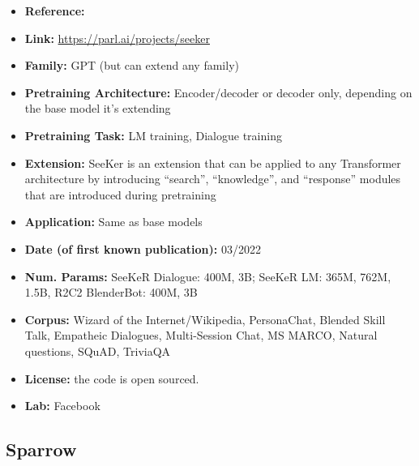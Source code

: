 \documentclass{article}
\begin{document}
            \begin{itemize}
                \item \textbf{Reference:} 
                \item \textbf{Link:} \url{https://parl.ai/projects/seeker}
                \item \textbf{Family:} GPT (but can extend any family) 
                \item \textbf{Pretraining Architecture:} Encoder/decoder or decoder only, depending on the base model it’s extending
                \item \textbf{Pretraining Task:} LM training, Dialogue training
                \item \textbf{Extension:} SeeKer is an extension that can be applied to any Transformer architecture by introducing “search”, “knowledge”, and “response” modules that are introduced during pretraining  
                \item \textbf{Application:} Same as base models
                \item \textbf{Date (of first known publication):} 03/2022
                \item \textbf{Num. Params:} SeeKeR Dialogue: 400M, 3B; SeeKeR LM: 365M, 762M, 1.5B, R2C2 BlenderBot: 400M, 3B
                \item \textbf{Corpus:} Wizard of the Internet/Wikipedia, PersonaChat, Blended Skill Talk, Empatheic Dialogues, Multi-Session Chat, MS MARCO, Natural questions, SQuAD, TriviaQA
                \item \textbf{License:} the code is open sourced.
                \item \textbf{Lab:} Facebook
            \end{itemize}

\subsection{Sparrow}
\end{document}
